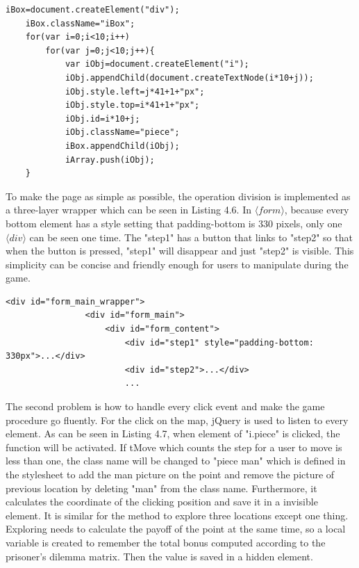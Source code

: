 \begin{lstlisting}[caption=Part of code to create a map]
iBox=document.createElement("div");
	iBox.className="iBox";
	for(var i=0;i<10;i++)
		for(var j=0;j<10;j++){
			var iObj=document.createElement("i");
			iObj.appendChild(document.createTextNode(i*10+j));
			iObj.style.left=j*41+1+"px";
			iObj.style.top=i*41+1+"px";
			iObj.id=i*10+j;
			iObj.className="piece";
			iBox.appendChild(iObj);
			iArray.push(iObj);
	}

\end{lstlisting}


To make the page as simple as possible, the operation division is implemented as a three-layer wrapper which can be seen in Listing 4.6. In $\langle form \rangle$, because every bottom element has a style setting that padding-bottom is 330 pixels, only one $\langle div \rangle$ can be seen one time. The "step1" has a button that links to "step2" so that when the button is pressed, "step1" will disappear and just "step2" is visible. This simplicity can be concise and friendly enough for users to manipulate during the game.
\begin{lstlisting}[caption=Part of the code to wrap elements]
<div id="form_main_wrapper">
                <div id="form_main">
                    <div id="form_content">
                    	<div id="step1" style="padding-bottom: 330px">...</div>
                    	<div id="step2">...</div>
                    	...

\end{lstlisting}

The second problem is how to handle every click event and make the game procedure go fluently. For the click on the map, jQuery is used to listen to every element. As can be seen in Listing 4.7, when element of "i.piece" is clicked, the function will be activated. If tMove which counts the step for a user to move is less than one, the class name will be changed to "piece man" which is defined in the stylesheet to add the man picture on the point and remove the picture of previous location by deleting "man" from the class name. Furthermore, it calculates the coordinate of the clicking position and save it in a invisible element. It is similar for the method to explore three locations except one thing. Exploring needs to calculate the payoff of the point at the same time, so a local variable is created to remember the total bonus computed according to the prisoner's dilemma matrix. Then the value is saved in a hidden element.

